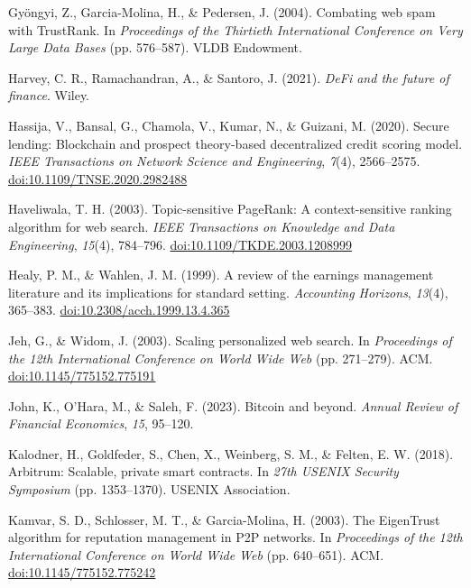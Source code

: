 \begin{enumerate}[label={[\arabic*]}, leftmargin=*, itemsep=0.35em, parsep=0pt]
  \item{}\label{ref:27} Gy\"{o}ngyi, Z., Garcia-Molina, H., \& Pedersen, J. (2004). Combating web spam with TrustRank. In \textit{Proceedings of the Thirtieth International Conference on Very Large Data Bases} (pp. 576--587). VLDB Endowment.
  \item{}\label{ref:28} Harvey, C. R., Ramachandran, A., \& Santoro, J. (2021). \textit{DeFi and the future of finance}. Wiley.
  \item{}\label{ref:29} Hassija, V., Bansal, G., Chamola, V., Kumar, N., \& Guizani, M. (2020). Secure lending: Blockchain and prospect theory-based decentralized credit scoring model. \textit{IEEE Transactions on Network Science and Engineering}, \textit{7}(4), 2566--2575. \href{https://doi.org/10.1109/TNSE.2020.2982488}{doi:10.1109/TNSE.2020.2982488}
  \item{}\label{ref:30} Haveliwala, T. H. (2003). Topic-sensitive PageRank: A context-sensitive ranking algorithm for web search. \textit{IEEE Transactions on Knowledge and Data Engineering}, \textit{15}(4), 784--796. \href{https://doi.org/10.1109/TKDE.2003.1208999}{doi:10.1109/TKDE.2003.1208999}
  \item{}\label{ref:31} Healy, P. M., \& Wahlen, J. M. (1999). A review of the earnings management literature and its implications for standard setting. \textit{Accounting Horizons}, \textit{13}(4), 365--383. \href{https://doi.org/10.2308/acch.1999.13.4.365}{doi:10.2308/acch.1999.13.4.365}
  \item{}\label{ref:32} Jeh, G., \& Widom, J. (2003). Scaling personalized web search. In \textit{Proceedings of the 12th International Conference on World Wide Web} (pp. 271--279). ACM. \href{https://doi.org/10.1145/775152.775191}{doi:10.1145/775152.775191}
  \item{}\label{ref:33} John, K., O'Hara, M., \& Saleh, F. (2023). Bitcoin and beyond. \textit{Annual Review of Financial Economics}, \textit{15}, 95--120.
  \item{}\label{ref:34} Kalodner, H., Goldfeder, S., Chen, X., Weinberg, S. M., \& Felten, E. W. (2018). Arbitrum: Scalable, private smart contracts. In \textit{27th USENIX Security Symposium} (pp. 1353--1370). USENIX Association.
  \item{}\label{ref:35} Kamvar, S. D., Schlosser, M. T., \& Garcia-Molina, H. (2003). The EigenTrust algorithm for reputation management in P2P networks. In \textit{Proceedings of the 12th International Conference on World Wide Web} (pp. 640--651). ACM. \href{https://doi.org/10.1145/775152.775242}{doi:10.1145/775152.775242}

\end{enumerate}
